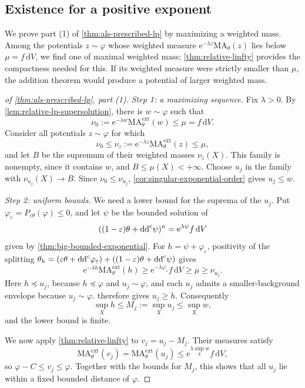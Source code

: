 \subsection{Existence for a positive exponent}

We prove part (1) of \cref{thm:als-prescribed-lp} by maximizing a weighted mass. Among the potentials $z\sim\varphi$ whose weighted measure $\mathrm{e}^{-\lambda z}\mathrm{MA}_\theta(z)$ lies below $\mu=f\,\mathrm{d}V$, we find one of maximal weighted mass; \cref{thm:relative-linfty} provides the compactness needed for this. If its weighted measure were strictly smaller than $\mu$, the addition theorem would produce a potential of larger weighted mass.

\begin{proof}[of \cref{thm:als-prescribed-lp}, part (1)]
\emph{Step 1: a maximizing sequence.} Fix $\lambda>0$. By \cref{lem:relative-lp-supersolution}, there is $w\sim\varphi$ such that
\[
 \nu_0:=\mathrm{e}^{-\lambda w}\mathrm{MA}^{\mathrm{ext}}_\theta(w)
 \leq\mu=f\,\mathrm{d}V.
\]
Consider all potentials $z\sim\varphi$ for which
\[
 \nu_0\leq\nu_z:=\mathrm{e}^{-\lambda z}
                   \mathrm{MA}^{\mathrm{ext}}_\theta(z)\leq\mu,
\]
and let $B$ be the supremum of their weighted masses $\nu_z(X)$. This family is nonempty, since it contains $w$, and $B\leq\mu(X)<+\infty$. Choose $u_j$ in the family with $\nu_{u_j}(X)\to B$. Since $\nu_0\leq\nu_{u_j}$, \cref{cor:singular-exponential-order} gives $u_j\leq w$.

\emph{Step 2: uniform bounds.} We need a lower bound for the suprema of the $u_j$. Put $\varphi_\varepsilon=P_{\varepsilon\theta}(\varphi)\leq0$, and let $\psi$ be the bounded solution of
\[
 ((1-\varepsilon)\theta+\mathrm{dd}^{\mathrm{c}}\psi)^n=\mathrm{e}^{\lambda\psi}f\,\mathrm{d}V
\]
given by \cref{thm:big-bounded-exponential}. For $h=\psi+\varphi_\varepsilon$, positivity of the splitting $\theta_h=(\varepsilon\theta+\mathrm{dd}^{\mathrm{c}}\varphi_\varepsilon)+((1-\varepsilon)\theta+\mathrm{dd}^{\mathrm{c}}\psi)$ gives
\[
 \mathrm{e}^{-\lambda h}\mathrm{MA}^{\mathrm{ext}}_\theta(h)
 \geq \mathrm{e}^{-\lambda\varphi_\varepsilon}f\,\mathrm{d}V
 \geq\mu\geq\nu_{u_j}.
\]
Here $h\preceq u_j$, because $h\preceq\varphi$ and $u_j\sim\varphi$, and each $u_j$ admits a smaller-background envelope because $u_j\sim\varphi$.  therefore gives $u_j\geq h$. Consequently
\[
 \sup_Xh\leq M_j:=\sup_Xu_j\leq\sup_Xw,
\]
and the lower bound is finite.

We now apply \cref{thm:relative-linfty} to $v_j=u_j-M_j$. Their measures satisfy
\[
 \mathrm{MA}^{\mathrm{ext}}_\theta(v_j)
 =\mathrm{MA}^{\mathrm{ext}}_\theta(u_j)
 \leq \mathrm{e}^{\lambda\sup_Xw}f\,\mathrm{d}V,
\]
so $\varphi-C\leq v_j\leq\varphi$. Together with the bounds for $M_j$, this shows that all $u_j$ lie within a fixed bounded distance of $\varphi$.


\end{proof}
